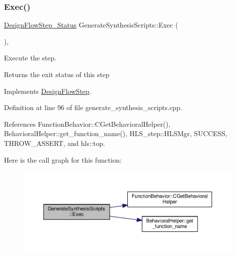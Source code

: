 \subsubsection{\texorpdfstring{Exec()}{Exec()}}
{\footnotesize\ttfamily \hyperlink{design__flow__step_8hpp_afb1f0d73069c26076b8d31dbc8ebecdf}{Design\+Flow\+Step\+\_\+\+Status} Generate\+Synthesis\+Scripts\+::\+Exec (\begin{DoxyParamCaption}{ }\end{DoxyParamCaption})\hspace{0.3cm}{\ttfamily [override]}, {\ttfamily [virtual]}}



Execute the step. 

\begin{DoxyReturn}{Returns}
the exit status of this step 
\end{DoxyReturn}


Implements \hyperlink{classDesignFlowStep_a77d7e38493016766098711ea24f60b89}{Design\+Flow\+Step}.



Definition at line 96 of file generate\+\_\+synthesis\+\_\+scripts.\+cpp.



References Function\+Behavior\+::\+C\+Get\+Behavioral\+Helper(), Behavioral\+Helper\+::get\+\_\+function\+\_\+name(), H\+L\+S\+\_\+step\+::\+H\+L\+S\+Mgr, S\+U\+C\+C\+E\+SS, T\+H\+R\+O\+W\+\_\+\+A\+S\+S\+E\+RT, and hls\+::top.

Here is the call graph for this function\+:
\nopagebreak
\begin{figure}[H]
\begin{center}
\leavevmode
\includegraphics[width=350pt]{dd/dde/classGenerateSynthesisScripts_aeba18d6961c98211710aa3ada02dc50e_cgraph}
\end{center}
\end{figure}
\mbox{\label{classGenerateSynthesisScripts_ac7727b3364b8ec425960a093d5ba61ee}} 
